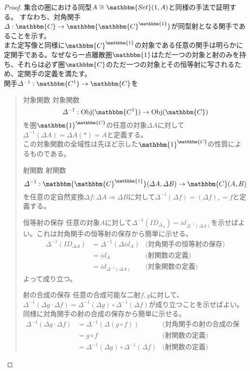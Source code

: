 \documentclass[uplatex,dvipdfmx]{jsarticle}
\newcommand{\cat}[1]{\mathbbm{#1}}
\newcommand{\arrow}{\rightarrow}
\newcommand{\functor}[3]{#1:\cat{#2}\arrow \cat{#3}}
\newcommand{\nat}[3]{#1:#2\Rightarrow #3}
\newcommand{\obj}[1]{\mathrm{Obj}(\cat{#1})}
\newcommand{\mor}[3]{#1:#2\arrow #3}
\newcommand{\arset}[3]{\cat{#1}(#2,#3)}
\newcommand{\funccat}[2]{\cat{#2}^\cat{#1}}
\newtheorem{proof}{証明}[section]
\numberwithin{proof}{subsection}
\newenvironment{mydescription}
{\begin{description}
  \setlength{\parskip}{0.5cm}
}
{\end{description}}
\begin{document}
  \begin{proof}
    集合の圏における同型$A\cong\arset{Set}{1}{A}$と同様の手法で証明する。
    すなわち、対角関手$\functor{\varDelta}{C}{\funccat{1}{C}}$が同型射となる関手であることを示す。\\
    また定写像と同様に$\funccat{1}{C}$の対象である任意の関手は明らかに定関手である。なぜなら一点離散圏$\cat{1}$はただ一つの対象と射のみを持ち、それらは必ず圏$\cat{C}$のただ一つの対象とその恒等射に写されるため、定関手の定義を満たす。\\
    関手$\functor{\varDelta^{-1}}{C^1}{C}$を
    \begin{quote}
			\begin{mydescription}
				\item[対象関数]対象関数\[\mor{\varDelta^{-1}}{\obj{C^1}}{\obj{C}}\]を圏$\funccat{C}{1}$の任意の対象$\varDelta A$に対して$\varDelta^{-1}(\varDelta A)=\varDelta A(*)=A$と定義する。\\
        この対象関数の全域性は先ほど示した$\funccat{C}{1}$の性質によるものである。
				\item[射関数]射関数\[\mor{\varDelta^{-1}}{\arset{\funccat{1}{C}}{\varDelta A}{\varDelta B}}{\arset{C}{A}{B}}\]を任意の定自然変換$\nat{\varDelta f}{\varDelta A}{\varDelta B}$に対して$\varDelta^{-1}(\varDelta f) = (\varDelta f)_*=f$と定義する。
				\item[恒等射の保存]任意の対象$A$に対して$\varDelta^{-1}(ID_{\varDelta_A})=id_{\varDelta^{-1}(\varDelta A)}$を示せばよい。これは対角関手の恒等射の保存から簡単に示せる。
				\begin{align*}
          \varDelta^{-1}(ID_{\varDelta A})&=\varDelta^{-1}(\varDelta id_A)&\text{(対角関手の恒等射の保存)}\\
          &=id_A&\text{(射関数の定義)}\\
          &=id_{\varDelta^{-1}(\varDelta A)}&\text{(対象関数の定義)}
        \end{align*}
        よって成り立つ。
				\item[射の合成の保存]任意の合成可能な二射$f,g$に対して、$\varDelta^{-1}(\varDelta g\cdot\varDelta f)=\varDelta^{-1}(\varDelta g)\circ\varDelta^{-1}(\varDelta f)$が成り立つことを示せばよい。同様に対角関手の射の合成の保存から簡単に示せる。
				\begin{align*}
          \varDelta^{-1}(\varDelta g\cdot\varDelta f)&=\varDelta^{-1}(\varDelta(g\circ f))&\text{(対角関手の射の合成の保存)}\\
          &=g\circ f&\text{(射関数の定義)}\\
          &=\varDelta^{-1}(\varDelta g)\circ\varDelta^{-1}(\varDelta f)&\text{(射関数の定義)}

\end{align*}
\end{mydescription}
\end{quote}
\end{proof}
\end{document}

